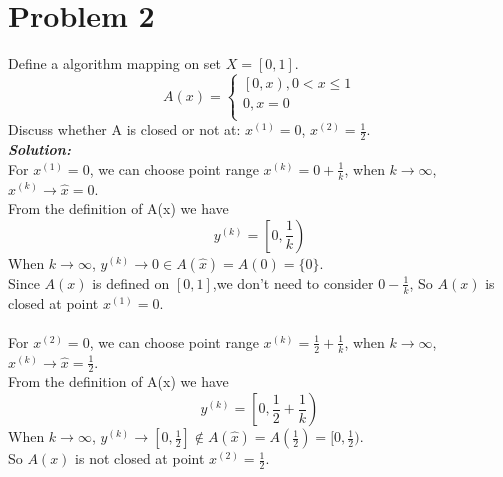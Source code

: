 \documentclass[paper=a4, fontsize=11pt]{scrartcl} %
\numberwithin{equation}{section} %
\numberwithin{figure}{section} %
\numberwithin{table}{section} %
\begin{document}
\section{Problem 2}
Define a algorithm mapping on set $X=[0,1]$.
\begin{equation} \nonumber
A(x)=
\left\{
\begin{aligned}
\left[0, x\right), 0<x\leq1 \\
0, x=0\\
\end{aligned}
\right.
\end{equation}
Discuss whether A is closed or not at: $x^{(1)}=0$, $x^{(2)}=\frac{1}{2}$.
\\
\emph{\textbf{Solution:}}\\
For $x^{(1)}=0$, we can choose point range $x^{(k)} = 0+\frac{1}{k}$, when $k\rightarrow\infty$, $x^{(k)}\rightarrow\hat{x}=0$.\\
From the definition of A(x) we have
\begin{equation} \nonumber
y^{(k)} = \left[0,\frac{1}{k}\right)
\end{equation}
When $k\rightarrow\infty$, $y^{(k)}\rightarrow0\in A(\hat{x})=A(0)=\{0\}$.\\
Since $A(x)$ is defined on $[0,1]$,we don't need to consider $0-\frac{1}{k}$, So $A(x)$ is closed at point $x^{(1)}=0$. \\
\\
For $x^{(2)}=0$, we can choose point range $x^{(k)} = \frac{1}{2}+\frac{1}{k}$, when $k\rightarrow\infty$, $x^{(k)}\rightarrow\hat{x}=\frac{1}{2}$.\\
From the definition of A(x) we have
\begin{equation} \nonumber
y^{(k)} = \left[0,\frac{1}{2}+\frac{1}{k}\right)
\end{equation}
When $k\rightarrow\infty$, $y^{(k)}\rightarrow[0,\frac{1}{2}] \notin A(\hat{x})=A(\frac{1}{2})=[0,\frac{1}{2})$.\\
So $A(x)$ is not closed at point $x^{(2)}=\frac{1}{2}$. 
\end{document}
